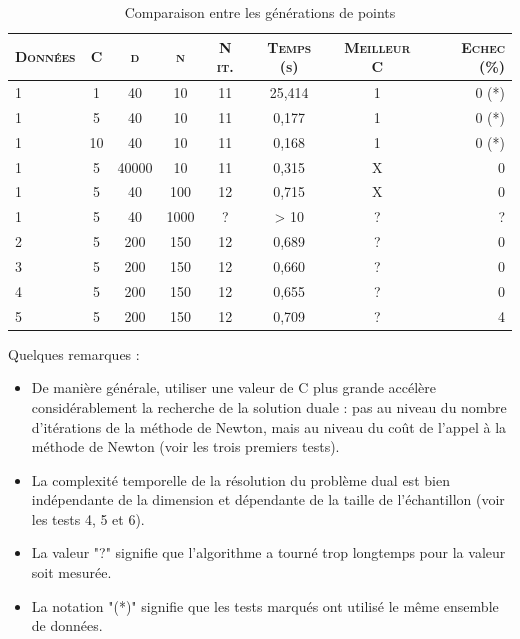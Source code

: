 \documentclass{article}
\begin{document}
     \begin{table}[H]
       \caption{Comparaison entre les générations de points}
       \begin{tabular}{|l|c|c|c|c|c|c|r|}
         \hline
         \textsc{Données} & \textsc{C} & \textsc{d} & \textsc{n} & \textsc{N it.} & \textsc{Temps (s)} & \textsc{Meilleur C} & \textsc{Echec (\%)}\\
         \hline
         1 & 1 & 40 & 10 & 11 & 25,414 & 1 & 0 (*)\\
         \hline
         1 & 5 & 40 & 10 & 11 & 0,177 & 1 & 0 (*)\\
         \hline
         1 & 10 & 40 & 10 & 11 & 0,168 & 1 & 0 (*)\\
         \hline
         1 & 5 & 40000 & 10 & 11 & 0,315 & X & 0\\
         \hline
         1 & 5 & 40 & 100 & 12 & 0,715 & X & 0\\
         \hline
         1 & 5 & 40 & 1000 & ? & > 10 & ? & ?\\
         \hline
         2 & 5 & 200 & 150 & 12 & 0,689 & ? & 0\\
         \hline
         3 & 5 & 200 & 150 & 12 & 0,660 & ? & 0\\
         \hline
         4 & 5 & 200 & 150 & 12 & 0,655 & ? & 0\\
         \hline
         5 & 5 & 200 & 150 & 12 & 0,709 & ? & 4\\
         \hline
       \end{tabular}
     \end{table}

Quelques remarques :
\begin{itemize}
\item De manière générale, utiliser une valeur de C plus grande accélère considérablement la recherche de la solution duale : pas au niveau du nombre d'itérations de la méthode de Newton, mais au niveau du coût de l'appel à la méthode de Newton (voir les trois premiers tests). 
\item La complexité temporelle de la résolution du problème dual est bien indépendante de la dimension et dépendante de la taille de l'échantillon (voir les tests 4, 5 et 6).
\item La valeur "?" signifie que l'algorithme a tourné trop longtemps pour la valeur soit mesurée.
\item La notation "(*)" signifie que les tests marqués ont utilisé le même ensemble de données.
\end{itemize}
\end{document}
